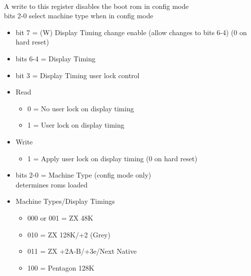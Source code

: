\\
A write to this register disables the boot rom in config mode\\
bits 2-0 select machine type when in config mode
\begin{itemize}
\item bit 7 = (W) Display Timing change enable (allow changes to
  bits 6-4) (0 on hard reset)
\item bits 6-4 = Display Timing
\item bit 3 = Display Timing user lock control
  \item[] Read
  \begin{itemize}
  \item 0 = No user lock on display timing
  \item 1 = User lock on display timing
  \end{itemize}
  \item[] Write
  \begin{itemize}
  \item 1 = Apply user lock on display timing (0 on hard reset)
  \end{itemize}
\item bits 2-0 = Machine Type (config mode only)\\
determines roms loaded
\item[] Machine Types/Display Timings
  \begin{itemize}
  \item 000 or 001 = ZX 48K
  \item 010 = ZX 128K/+2 (Grey)
  \item 011 = ZX +2A-B/+3e/Next Native
  \item 100 = Pentagon 128K
  \end{itemize}
\end{itemize}

